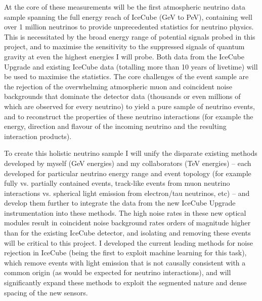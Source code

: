 \documentclass[a4paper,11pt]{article}
\begin{document}
At the core of these measurements will be the first atmospheric neutrino data sample spanning the full energy reach of IceCube (GeV to PeV), containing well over 1 million neutrinos to provide unprecedented statistics for neutrino physics. This is necessitated by the broad energy range of potential signals probed in this project, and to maximise the sensitivity to the suppressed signals of quantum gravity at even the highest energies I will probe. Both data from the IceCube Upgrade and existing IceCube data (totalling more than 10 years of livetime) will be used to maximise the statistics. The core challenges of the event sample are the rejection of the overwhelming atmospheric muon and coincident noise backgrounds that dominate the detector data (thousands or even millions of which are observed for every neutrino) to yield a pure sample of neutrino events, and to reconstruct the properties of these neutrino interactions (for example the energy, direction and flavour of the incoming neutrino and the resulting interaction products).

To create this holistic neutrino sample I will unify the disparate existing methods developed by myself (GeV energies) and my collaborators (TeV energies) -- each developed for particular neutrino energy range and event topology (for example fully vs. partially contained events, track-like events from muon neutrino interactions vs. spherical light emission from electron/tau neutrinos, etc) -- and develop them further to integrate the data from the new IceCube Upgrade instrumentation into these methods. The high noise rates in these new optical modules result in coincident noise background rates orders of magnitude higher than for the existing IceCube detector, and isolating and removing these events will be critical to this project. I developed the current leading methods for noise rejection in IceCube (being the first to exploit machine learning for this task), which remove events with light emission that is not causally consistent with a common origin (as would be expected for neutrino interactions), and will significantly expand these methods to exploit the segmented nature and dense spacing of the new sensors.
\end{document}

